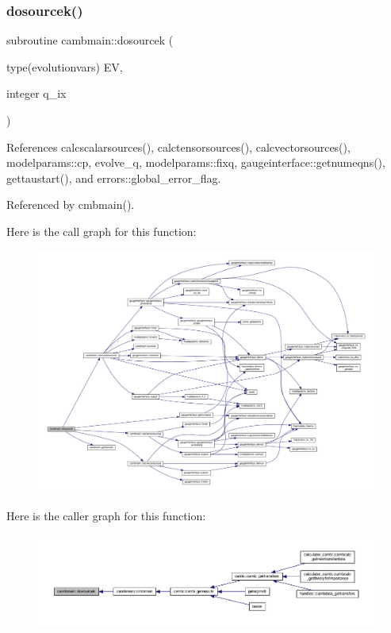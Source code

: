 \subsubsection{\texorpdfstring{dosourcek()}{dosourcek()}}
{\footnotesize\ttfamily subroutine cambmain\+::dosourcek (\begin{DoxyParamCaption}\item[{type(evolutionvars)}]{EV,  }\item[{integer}]{q\+\_\+ix }\end{DoxyParamCaption})\hspace{0.3cm}{\ttfamily [private]}}



References calcscalarsources(), calctensorsources(), calcvectorsources(), modelparams\+::cp, evolve\+\_\+q, modelparams\+::fixq, gaugeinterface\+::getnumeqns(), gettaustart(), and errors\+::global\+\_\+error\+\_\+flag.



Referenced by cmbmain().

Here is the call graph for this function\+:
\nopagebreak
\begin{figure}[H]
\begin{center}
\leavevmode
\includegraphics[width=350pt]{namespacecambmain_a9ff2ea693941648b6f34d86e019f9613_cgraph}
\end{center}
\end{figure}
Here is the caller graph for this function\+:
\nopagebreak
\begin{figure}[H]
\begin{center}
\leavevmode
\includegraphics[width=350pt]{namespacecambmain_a9ff2ea693941648b6f34d86e019f9613_icgraph}
\end{center}
\end{figure}
\mbox{\label{namespacecambmain_a8861dfd3252de9c7b39b9c09ee415010}} 
